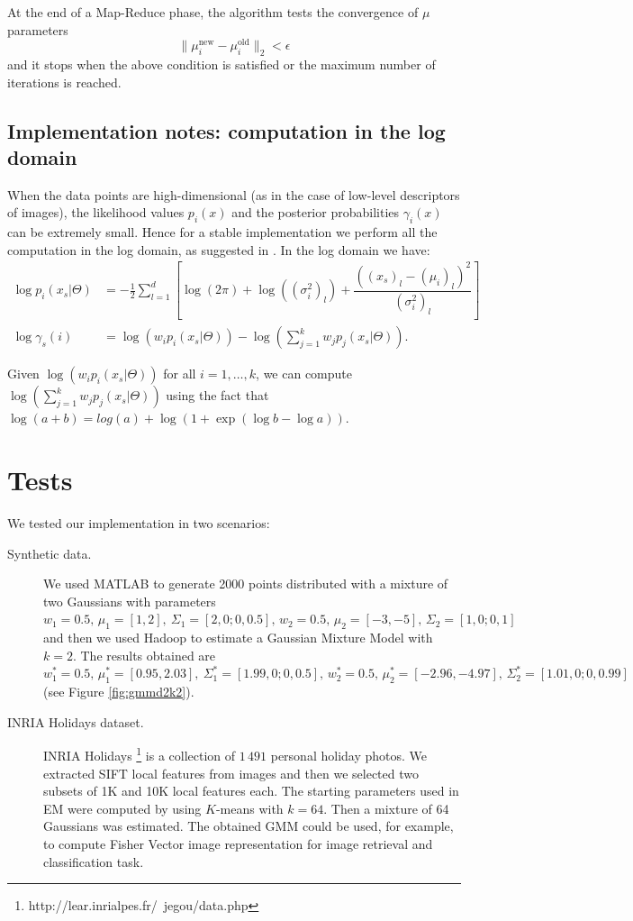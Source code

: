 \documentclass[a4paper,10pt]{article}
\begin{document}
At the end of a Map-Reduce phase, the algorithm tests the convergence of $\mu$ parameters
$$\|\mu_i^{\text{new}}-\mu_i^{\text{old}}\|_2<\epsilon$$ 
and it stops when the above condition is satisfied or the maximum number of iterations is reached.


\subsection{Implementation notes: computation in the log domain}
When the data points are high-dimensional (as in the case of low-level descriptors of images), the likelihood values $p_i(x)$ and the posterior probabilities $\gamma_i(x)$ can be extremely small. Hence for a stable implementation we perform all the computation in the log domain, as suggested in \cite{sanchez13}. 
In the log domain we have:
\begin{align}
\log p_i(x_s|\Theta)&=-\frac{1}{2}\sum_{l=1}^d\left[\log(2\pi)+  \log((\sigma^2_{i})_l) +  \dfrac{\left((x_{s})_l-(\mu_{i})_l\right)^2}{(\sigma^2_{i})_l }\right]\\
\log \gamma_s(i)&=\log \left(w_i  p_i(x_s|\Theta) \right )- \log \left( \sum _{j=1}^k w_j  p_j(x_s|\Theta)\right).
\end{align}

Given $\log \left(w_i  p_i(x_s|\Theta) \right )$ for all $i=1,\dots, k$,  we can compute $\log \left( \sum _{j=1}^k w_j  p_j(x_s|\Theta)\right)$ using the fact that
$\log(a+b)= log(a)+ \log\left(1+\exp(\log b- \log a) \right).$\\


\section{Tests}
We tested our implementation in two scenarios:
\begin{description}
	\item[Synthetic data.] We used MATLAB to generate 2000 points distributed with a mixture of two Gaussians with parameters $w_1=0.5,\, \mu_1=[1 , 2],\ \Sigma_1=[2, 0; 0, 0.5], \, w_2=0.5, \, \mu_2=[-3, -5], \,\Sigma_2=[1, 0; 0, 1]$ and then we used Hadoop to estimate a Gaussian Mixture Model with $k=2$. The results obtained are $w_1^*=0.5,\, \mu_1^*=[0.95 , 2.03],\ \Sigma_1^*=[1.99, 0; 0, 0.5], \, w_2^*=0.5, \, \mu_2^*=[-2.96,  -4.97], \,\Sigma_2^*=[1.01, 0; 0, 0.99]$ (see  Figure \ref{fig:gmmd2k2}). 
	\item[INRIA Holidays dataset.] INRIA Holidays \footnote{http://lear.inrialpes.fr/~jegou/data.php}
	is a collection of $1\,491$ personal holiday photos. We extracted SIFT local features from images and then we selected two subsets of 1K and 10K local features each. The starting parameters used in EM were computed by using $K$-means with $k=64$. Then a mixture of 64 Gaussians was estimated. The obtained GMM could be used, for example, to compute Fisher Vector \cite{sanchez13} image representation for image retrieval and classification task.
	
\end{description}
\end{document}
